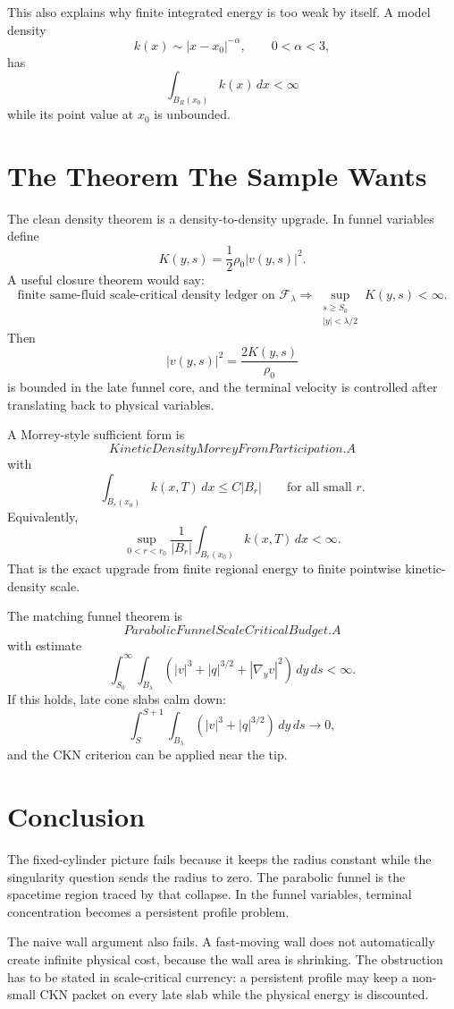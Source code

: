 \documentclass[11pt]{article}
\newcommand{\F}{\mathcal F_\lambda}
\newcommand{\dd}{\,d}
\begin{document}
This also explains why finite integrated energy is too weak by itself. A model density
\[
k(x)\sim |x-x_0|^{-\alpha},
\qquad
0<\alpha<3,
\]
has
\[
\int_{B_R(x_0)}k(x)\dd x<\infty
\]
while its point value at \(x_0\) is unbounded.

\section{The Theorem The Sample Wants}

The clean density theorem is a density-to-density upgrade. In funnel variables define
\[
K(y,s)=\frac12\rho_0|v(y,s)|^2.
\]
A useful closure theorem would say:
\[
\boxed{
\text{finite same-fluid scale-critical density ledger on }\F
\Longrightarrow
\sup_{\substack{s\ge S_0\\ |y|<\lambda/2}}K(y,s)<\infty .
}
\]
Then
\[
|v(y,s)|^2=\frac{2K(y,s)}{\rho_0}
\]
is bounded in the late funnel core, and the terminal velocity is controlled after translating back to physical variables.

A Morrey-style sufficient form is
\[
\boxed{KineticDensityMorreyFromParticipation.A}
\]
with
\[
\int_{B_r(x_0)}k(x,T)\dd x
\le
C|B_r|
\qquad
\text{for all small }r.
\]
Equivalently,
\[
\sup_{0<r<r_0}
\frac1{|B_r|}
\int_{B_r(x_0)}k(x,T)\dd x
<\infty.
\]
That is the exact upgrade from finite regional energy to finite pointwise kinetic-density scale.

The matching funnel theorem is
\[
\boxed{ParabolicFunnelScaleCriticalBudget.A}
\]
with estimate
\[
\int_{S_0}^{\infty}\int_{B_\lambda}
\left(|v|^3+|q|^{3/2}+|\nabla_yv|^2\right)\dd y\dd s
<\infty.
\]
If this holds, late cone slabs calm down:
\[
\int_S^{S+1}\int_{B_\lambda}
\left(|v|^3+|q|^{3/2}\right)\dd y\dd s
\to0,
\]
and the CKN criterion can be applied near the tip.

\section{Conclusion}

The fixed-cylinder picture fails because it keeps the radius constant while the singularity question sends the radius to zero. The parabolic funnel is the spacetime region traced by that collapse. In the funnel variables, terminal concentration becomes a persistent profile problem.

The naive wall argument also fails. A fast-moving wall does not automatically create infinite physical cost, because the wall area is shrinking. The obstruction has to be stated in scale-critical currency: a persistent profile may keep a non-small CKN packet on every late slab while the physical energy is discounted.
\end{document}
